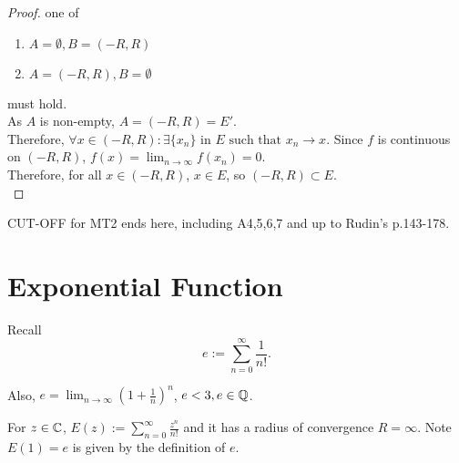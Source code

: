 \begin{thm}
\begin{proof}
		one of \begin{enumerate}[label=(\roman*)]
			\item $A=\emptyset,B=(-R,R)$
			\item $A=(-R,R),B=\emptyset$
		\end{enumerate}
		must hold.\\
		As $A$ is non-empty, $A=(-R,R)=E'$.\\
		Therefore, $\forall{x \in (-R,R)}: \exists{\{ {x}_{n}\} \text{ in } E} \text{ such that } x_n\to x$.
		Since $f$ is continuous on $(-R,R)$, $f(x)=\lim_{n\to \infty}{f(x_n)}=0$.\\
		Therefore, for all $x \in (-R,R)$, $x \in E$, so $(-R,R)\subset E$.\\
	\end{proof}
\end{thm}

\begin{remark}
	CUT-OFF for MT2 ends here, including A4,5,6,7 and up to Rudin's p.143-178.
\end{remark}



\section{Exponential Function}
Recall \[
	e:=\sum_{n=0}^{\infty}{\frac{1}{n!}}
	.\]

Also, $e=\lim_{n\to \infty}{\left(1+\frac{1}{n}\right)^{n}}$, $e <3, e \in \mathbb{Q}$.
\begin{define}
	For $z \in \mathbb{C}$, $E(z):=\sum_{n=0}^{\infty}{\frac{z^{n}}{n!}}$ and it has a radius of convergence $R=\infty$.
	Note $E(1)=e$ is given by the definition of $e$.
\end{define}

